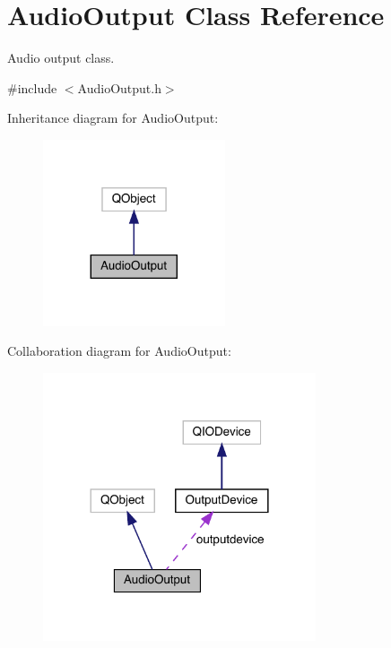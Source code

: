 \hypertarget{class_audio_output}{}\section{Audio\+Output Class Reference}
\label{class_audio_output}


Audio output class.  




{\ttfamily \#include $<$Audio\+Output.\+h$>$}



Inheritance diagram for Audio\+Output\+:
\nopagebreak
\begin{figure}[H]
\begin{center}
\leavevmode
\includegraphics[width=152pt]{class_audio_output__inherit__graph}
\end{center}
\end{figure}


Collaboration diagram for Audio\+Output\+:
\nopagebreak
\begin{figure}[H]
\begin{center}
\leavevmode
\includegraphics[width=228pt]{class_audio_output__coll__graph}
\end{center}
\end{figure}
